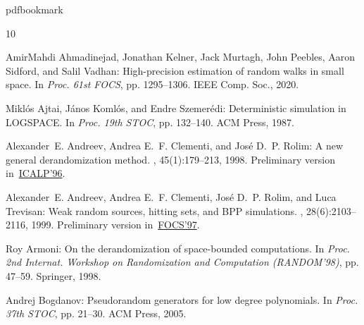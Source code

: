 \newcommand{\prelim}{Preliminary version in\ }\newcommand{\prelims}{Preliminary
  versions in\ }
\providecommand{\bibhead}[1]{}
\expandafter\ifx\csname pdfbookmark\endcsname\relax%
  \providecommand{\tocrefpdfbookmark}{}
\else\providecommand{\tocrefpdfbookmark}{%
   \hypertarget{tocreferences}{}%
   \pdfbookmark[1]{References}{tocreferences}}%
\fi

\tocrefpdfbookmark
\begin{thebibliography}{10}

\bibhead{AKMPSV20}
{\sc AmirMahdi Ahmadinejad, Jonathan Kelner, Jack Murtagh, John Peebles, Aaron
  Sidford, and Salil Vadhan}: High-precision estimation of random walks in
  small space.
\newblock In {\em Proc. 61st FOCS}, pp. 1295--1306. IEEE Comp. Soc., 2020.

\bibhead{AKS87}
{\sc Mikl{\'o}s Ajtai, J{\'a}nos Koml{\'o}s, and Endre Szemer{\'e}di}:
  Deterministic simulation in {LOGSPACE}.
\newblock In {\em Proc. 19th STOC}, pp. 132--140. ACM Press, 1987.
\newblock [\epfmtdoi{10.1145/28395.28410}]

\bibhead{ACR98}
{\sc Alexander~E. Andreev, Andrea E.~F. Clementi, and Jos\'{e} D.~P. Rolim}: A
  new general derandomization method.
, 45(1):179--213, 1998.
\newblock \prelim \href{https://doi.org/10.1007/3-540-61440-0\_142}{ICALP'96}.
\newblock [\epfmtdoi{10.1145/273865.273933}]

\bibhead{ACRT99}
{\sc Alexander~E. Andreev, Andrea E.~F. Clementi, Jos\'e D.~P. Rolim, and Luca
  Trevisan}: Weak random sources, hitting sets, and {BPP} simulations.
, 28(6):2103--2116, 1999.
\newblock \prelim \href{https://doi.org/10.1109/SFCS.1997.646115}{FOCS'97}.

\bibhead{Arm98}
{\sc Roy Armoni}: On the derandomization of space-bounded computations.
\newblock In {\em Proc. 2nd Internat. Workshop on Randomization and Computation
  (RANDOM'98)}, pp. 47--59. Springer, 1998.
\newblock [\epfmtdoi{10.1007/3-540-49543-6\_5}]

\bibhead{Bog05}
{\sc Andrej Bogdanov}: Pseudorandom generators for low degree polynomials.
\newblock In {\em Proc. 37th STOC}, pp. 21--30. ACM Press, 2005.
\newblock [\epfmtdoi{10.1145/1060590.1060594}]


\end{thebibliography}
